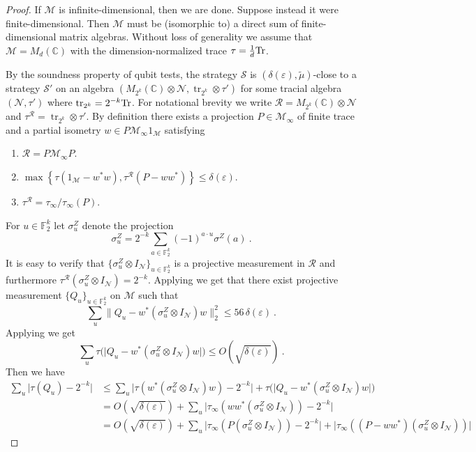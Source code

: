 \documentclass[11pt]{article}
\theoremstyle{definition}
\newcommand{\strategy}{\mathscr{S}}
\newcommand{\Tr}{\mbox{\rm Tr}}
\newcommand{\C}{\ensuremath{\mathbb{C}}}
\newcommand{\F}{\ensuremath{\mathbb{F}}}
\newcommand{\mM}{\ensuremath{\mathcal{M}}}
\newcommand{\mR}{\ensuremath{\mathcal{R}}}
\newcommand{\eps}{\varepsilon}
\newcommand{\mN}{\mathcal{N}}
\DeclareMathOperator{\tr}{tr}
\begin{document}
\begin{proof}
If $\mM$ is infinite-dimensional, then we are done. Suppose instead it were finite-dimensional. Then $\mM$ must be (isomorphic to) a direct sum of finite-dimensional matrix algebras. Without loss of generality we assume that $\mM = M_{d}(\C)$ with the dimension-normalized trace $\tau = \frac{1}{d} \Tr$. 

By the soundness property of qubit tests, the strategy $\strategy$ is $(\delta(\eps),\tilde{\mu})$-close to a strategy $\strategy'$ on an algebra $(M_{2^k}(\C) \otimes \mN,\tr_{2^k} \otimes \tau')$ for some tracial algebra $(\mN,\tau')$ where $\tr_{2^k} = 2^{-k} \Tr$. For notational brevity we write $\mR = M_{2^k}(\C) \otimes \mN$ and $\tau^{\mR} = \tr_{2^k} \otimes \tau'$. By definition there exists a projection $P \in \mM_\infty$ of finite trace and a partial isometry $w \in P \mM_\infty 1_\mM$ satisfying
\begin{enumerate}
	\item $\mR = P \mM_\infty P$. 
	\item $\max \left \{ \tau(1_\mM - w^* w), \tau^{\mR} (P - w w^*) \right \} \leq \delta(\eps)$.
	\item $\tau^{\mR} = \tau_\infty/\tau_\infty(P)$.
\end{enumerate}
For $u \in \F_2^k$ let $\sigma^Z_u$ denote the projection
\[
	\sigma^Z_u = 2^{-k} \sum_{a \in \F_2^k} (-1)^{a \cdot u} \sigma^Z(a)~.
\]
It is easy to verify that $\{\sigma^Z_u \otimes I_\mN \}_{u \in \F_2^k}$ is a projective measurement in $\mR$ and furthermore $\tau^{\mR}(\sigma^Z_u \otimes I_\mN) = 2^{-k}$. Applying  we get that there exist projective measurement $\{Q_u\}_{u \in \F_2^k}$ on $\mM$ such that
\[
	\sum_u \| Q_u - w^* (\sigma^Z_u \otimes I_\mN) w \|_2^2 \leq 56\, \delta(\eps)~.
\]
Applying  we get
\[
	\sum_u \tau \Big ( \Big| Q_u - w^* (\sigma^Z_u \otimes I_\mN) w\Big| \Big) \leq O(\sqrt{\delta(\eps)})~.
\]
Then we have
\begin{align*}
	\sum_u \Big| \tau(Q_u) - 2^{-k} \Big| &\leq \sum_u \Big | \tau(w^* (\sigma^Z_u \otimes I_\mN) w) - 2^{-k} \Big| + \tau \Big ( \Big| Q_u - w^* (\sigma^Z_u \otimes I_\mN) w\Big| \Big) \\
	&= O(\sqrt{\delta(\eps)}) + \sum_u \Big | \tau_\infty (w w^* (\sigma^Z_u \otimes I_\mN)) - 2^{-k} \Big| \\
	&= O(\sqrt{\delta(\eps)}) + \sum_u \Big | \tau_\infty (P (\sigma^Z_u \otimes I_\mN)) - 2^{-k} \Big| + \Big | \tau_\infty((P - ww^*)(\sigma^Z_u \otimes I_\mN)) \Big|

\end{align*}
\end{proof}
\end{document}
